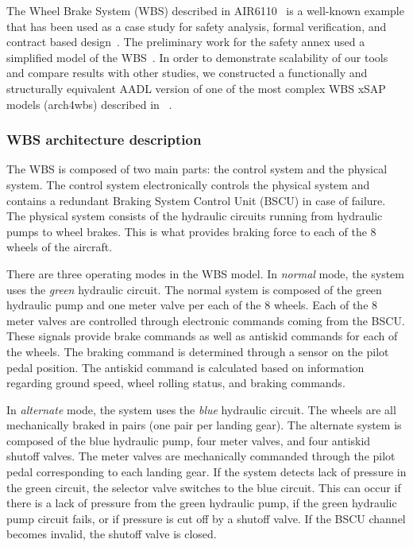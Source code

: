 The Wheel Brake System (WBS) described in AIR6110~\cite{AIR6110} is a well-known example that has been used as a case study for safety analysis, formal verification, and contract based design~\cite{DBLP:conf/cav/BozzanoCPJKPRT15, 10.1007/978-3-319-11936-6-7, CAV2015:BoCiGrMa, Joshi05:SafeComp}. The preliminary work for the safety annex used a simplified model of the WBS~\cite{Stewart17:IMBSA}. In order to demonstrate scalability of our tools and compare results with other studies, we constructed a functionally and structurally equivalent AADL version of one of the most complex WBS xSAP models (arch4wbs) described in %
~\cite{DBLP:conf/cav/BozzanoCPJKPRT15}.  %

\subsubsection{WBS architecture description}
The WBS is composed of two main parts: the control system and the physical system. The control system electronically controls the physical system and contains a redundant Braking System Control Unit (BSCU) in case of failure. The physical system consists of the hydraulic circuits running from hydraulic pumps to wheel brakes. This is what provides braking force to each of the 8 wheels of the aircraft.

There are three operating modes in the WBS model. In \textit{normal} mode, the system uses the \textit{green} hydraulic circuit. The normal system is composed of the green hydraulic pump and one meter valve per each of the 8 wheels. Each of the 8 meter valves are controlled through electronic commands coming from the BSCU. These signals provide brake commands as well as antiskid commands for each of the wheels. The braking command is determined through a sensor on the pilot pedal position. The antiskid command is calculated based on information regarding ground speed, wheel rolling status, and braking commands.

In \textit{alternate} mode, the system uses the \textit{blue} hydraulic circuit.  The wheels are all mechanically braked in pairs (one pair per landing gear). The alternate system is composed of the blue hydraulic pump, four meter valves, and four antiskid shutoff valves. The meter valves are mechanically commanded through the pilot pedal corresponding to each landing gear. If the system detects lack of pressure in the green circuit, the selector valve switches to the blue circuit. This can occur if there is a lack of pressure from the green hydraulic pump, if the green hydraulic pump circuit fails, or if pressure is cut off by a shutoff valve. If the BSCU channel becomes invalid, the shutoff valve is closed.


